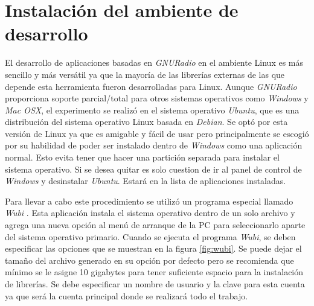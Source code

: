 
\chapter{Instalaci\'on del ambiente de desarrollo}
\label{AppA}

El desarrollo de aplicaciones basadas en \emph{GNURadio} en el ambiente Linux es m\'as sencillo y m\'as vers\'atil ya que la
mayor\'ia de las librer\'ias externas de las que depende esta herramienta fueron desarrolladas para Linux.
Aunque \emph{GNURadio} proporciona soporte parcial/total para otros sistemas operativos como \emph{Windows} y \emph{Mac OSX}, el
experimento se realiz\'o en el sistema operativo \emph{Ubuntu}, que es una distribuci\'on del sistema operativo
Linux basada en \emph{Debian}. Se opt\'o por esta versi\'on de Linux ya que es amigable y f\'acil de usar pero principalmente se
escogi\'o por su habilidad de poder ser instalado dentro de \emph{Windows} como una aplicaci\'on normal. Esto evita tener que
hacer una partici\'on separada para instalar el sistema operativo. Si se desea quitar es solo cuestion de ir al panel de control
de \emph{Windows} y desinstalar \emph{Ubuntu}. Estar\'a en la lista de aplicaciones instaladas.

Para llevar a cabo este procedimiento se utiliz\'o un programa especial llamado \emph{Wubi} \cite{russo}. Esta aplicaci\'on
instala el sistema operativo dentro de un solo archivo y agrega una nueva opci\'on al men\'u de arranque de la PC para
seleccionarlo aparte del sistema operativo primario. Cuando se ejecuta el programa \emph{Wubi}, se deben especificar las opciones
que se muestran en la figura \ref{fig:wubi}. Se puede dejar el tama\~no del archivo generado en su opci\'on por defecto pero se
recomienda que m\'inimo se le asigne 10 gigabytes para tener suficiente espacio para la instalaci\'on de librer\'ias. Se debe
especificar un nombre de usuario y la clave para esta cuenta ya que ser\'a la cuenta principal donde se realizar\'a todo el trabajo.

